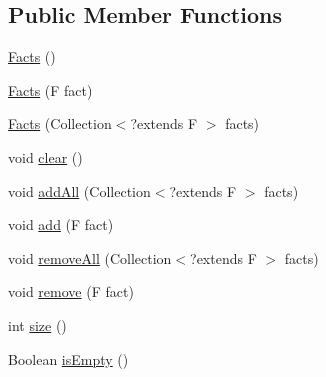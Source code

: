 \subsection*{Public Member Functions}
\begin{DoxyCompactItemize}
\item 
\hyperlink{classit_1_1emarolab_1_1cagg_1_1core_1_1evaluation_1_1semanticGrammar_1_1syntaxCompiler_1_1Semanta17363eb7db3bfea12328c626a3d6723_a0dc1c0ac66a9318ed9fcec1cc26fb1d2}{Facts} ()
\item 
\hyperlink{classit_1_1emarolab_1_1cagg_1_1core_1_1evaluation_1_1semanticGrammar_1_1syntaxCompiler_1_1Semanta17363eb7db3bfea12328c626a3d6723_ac1a60037a6b4427047b2c8e2bd2058a8}{Facts} (F fact)
\item 
\hyperlink{classit_1_1emarolab_1_1cagg_1_1core_1_1evaluation_1_1semanticGrammar_1_1syntaxCompiler_1_1Semanta17363eb7db3bfea12328c626a3d6723_aaf7cc39870ccffa6cde7a120b3ff3e6c}{Facts} (Collection$<$?extends F $>$ facts)
\item 
void \hyperlink{classit_1_1emarolab_1_1cagg_1_1core_1_1evaluation_1_1semanticGrammar_1_1syntaxCompiler_1_1Semanta17363eb7db3bfea12328c626a3d6723_aec9e9501890a8fdaf1cb37d816f4e057}{clear} ()
\item 
void \hyperlink{classit_1_1emarolab_1_1cagg_1_1core_1_1evaluation_1_1semanticGrammar_1_1syntaxCompiler_1_1Semanta17363eb7db3bfea12328c626a3d6723_a40f079cf68df9f1321cd92749672a0f6}{add\-All} (Collection$<$?extends F $>$ facts)
\item 
void \hyperlink{classit_1_1emarolab_1_1cagg_1_1core_1_1evaluation_1_1semanticGrammar_1_1syntaxCompiler_1_1Semanta17363eb7db3bfea12328c626a3d6723_afe5a22335f14fa9bc6da54b2f81544ac}{add} (F fact)
\item 
void \hyperlink{classit_1_1emarolab_1_1cagg_1_1core_1_1evaluation_1_1semanticGrammar_1_1syntaxCompiler_1_1Semanta17363eb7db3bfea12328c626a3d6723_aedeab8ebfcdb2def1822f6c3e6d8d12b}{remove\-All} (Collection$<$?extends F $>$ facts)
\item 
void \hyperlink{classit_1_1emarolab_1_1cagg_1_1core_1_1evaluation_1_1semanticGrammar_1_1syntaxCompiler_1_1Semanta17363eb7db3bfea12328c626a3d6723_ad8489a52be03f2227af39f773f6e0475}{remove} (F fact)
\item 
int \hyperlink{classit_1_1emarolab_1_1cagg_1_1core_1_1evaluation_1_1semanticGrammar_1_1syntaxCompiler_1_1Semanta17363eb7db3bfea12328c626a3d6723_ab000cc1e128ea3298d7a476d4a7711ce}{size} ()
\item 
Boolean \hyperlink{classit_1_1emarolab_1_1cagg_1_1core_1_1evaluation_1_1semanticGrammar_1_1syntaxCompiler_1_1Semanta17363eb7db3bfea12328c626a3d6723_a5a02d2b6a4998804e2be1284fb505654}{is\-Empty} ()

\end{DoxyCompactItemize}
